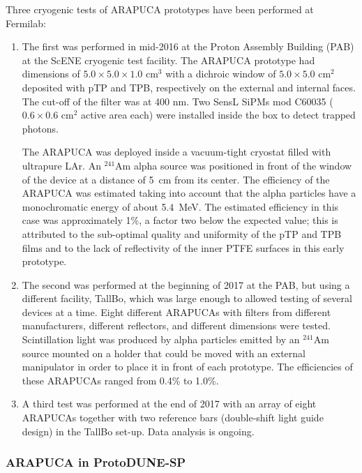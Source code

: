 Three cryogenic tests of ARAPUCA prototypes have been performed at Fermilab:
\begin{enumerate}
\item The first  was performed in mid-2016 at the Proton Assembly Building (PAB) at the ScENE cryogenic test facility. The ARAPUCA prototype had dimensions of  $5.0 \times 5.0 \times 1.0$ cm$^3$ with a dichroic window of $5.0 \times 5.0$ cm$^2$ deposited with pTP and TPB, respectively on the external and internal faces. The cut-off of the filter was at 400 nm. Two SensL SiPMs mod C60035 ($0.6 \times 0.6$ cm$^2$ active area each) were installed inside the box to detect trapped photons. 

The ARAPUCA was deployed inside a vacuum-tight cryostat filled with ultrapure LAr. An $^{241}$Am alpha source was positioned in front of the window of the device at a distance of  \SI{5}{cm} from its center. The efficiency of the ARAPUCA was estimated taking into account that the alpha particles have a  monochromatic energy of about \SI{5.4}{MeV}. 
The estimated efficiency in this case was approximately 1\%, a factor two below the expected value; this is attributed to the sub-optimal quality and uniformity of the pTP and TPB films and to the lack of reflectivity of the inner PTFE surfaces in this early prototype.

\item The second  was performed at the beginning of 2017 at the PAB, but using a different facility, 
TallBo, which was large enough to allowed testing of several devices at a time. Eight different ARAPUCAs with 
filters from different manufacturers, different reflectors, and different dimensions were tested.  
Scintillation light was produced by alpha particles emitted by an $^{241}$Am 
source mounted on a holder that could be moved with an external manipulator in order to place it in 
front of each prototype. The efficiencies of these ARAPUCAs ranged from 0.4\% to 1.0\%.

\item A third test was performed at the end of 2017 with an array of eight ARAPUCAs together with two 
reference bars (double-shift light guide design) in the TallBo set-up. Data analysis is ongoing. 

\end{enumerate}

\subsubsection{ARAPUCA in ProtoDUNE-SP}

